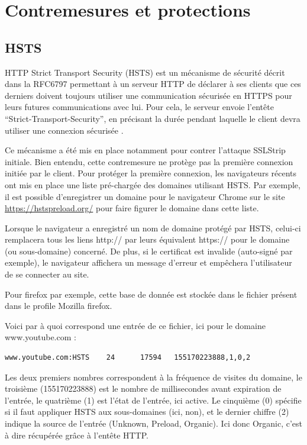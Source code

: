 \section{Contremesures et protections}

\subsection{HSTS}

\label{sec:hsts}

HTTP Strict Transport Security (HSTS) est un mécanisme de sécurité décrit dans la RFC6797 permettant à un serveur HTTP de déclarer à ses clients que ces derniers doivent toujours utiliser une communication sécurisée en HTTPS pour leurs futures communications avec lui. Pour cela, le serveur envoie l'entête ``Strict-Transport-Security'', en précisant la durée pendant laquelle le client devra utiliser une connexion sécurisée \cite{hsts}.

Ce mécanisme a été mis en place notamment pour contrer l'attaque SSLStrip initiale. Bien entendu, cette contremesure ne protège pas la première connexion initiée par le client. Pour protéger la première connexion, les navigateurs récents ont mis en place une liste pré-chargée des domaines utilisant HSTS. Par exemple, il est possible d'enregistrer un domaine pour le navigateur Chrome sur le site \url{https://hstspreload.org/} pour faire figurer le domaine dans cette liste.

Lorsque le navigateur a enregistré un nom de domaine protégé par HSTS, celui-ci remplacera tous les liens http:// par leurs équivalent https:// pour le domaine (ou sous-domaine) concerné. De plus, si le certificat est invalide (auto-signé par exemple), le navigateur affichera un message d'erreur et empêchera l'utilisateur de se connecter au site.

Pour firefox par exemple, cette base de donnée est stockée dans le fichier  présent dans le profile Mozilla firefox.

Voici par à quoi correspond une entrée de ce fichier, ici pour le domaine www.youtube.com :

\begin{verbatim}
www.youtube.com:HSTS    24      17594   155170223888,1,0,2
\end{verbatim}

Les deux premiers nombres correspondent à la fréquence de visites du domaine, le troisième (155170223888) est le nombre de millisecondes avant expiration de l'entrée, le quatrième (1) est l'état de l'entrée, ici active. Le cinquième (0) spécifie si il faut appliquer HSTS aux sous-domaines (ici, non), et le dernier chiffre (2) indique la source de l'entrée (Unknown, Preload, Organic). Ici donc Organic, c'est à dire récupérée grâce à l'entête HTTP.

